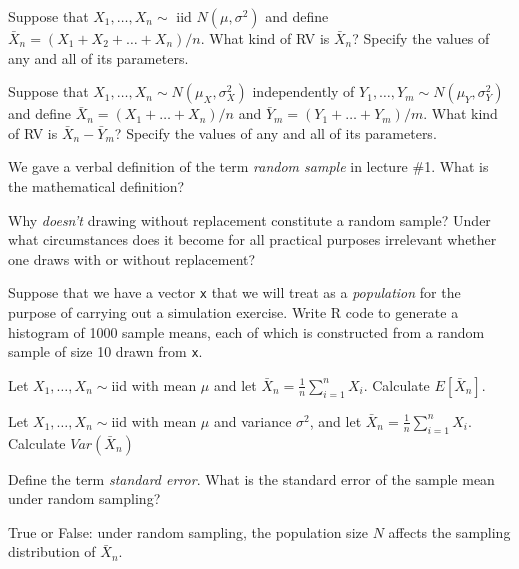 \documentclass[addpoints,12pt]{exam}
\begin{document}
\begin{questions}

\question Suppose that $X_1, \dots, X_n \sim \text{ iid } N(\mu, \sigma^2)$ and define $\bar{X}_n = (X_1 + X_2 + \dots + X_n) / n$.
What kind of RV is $\bar{X}_n$?
Specify the values of any and all of its parameters.


\question Suppose that $X_1, \dots, X_n \sim N(\mu_X, \sigma_X^2)$ independently of $Y_1, \dots, Y_m \sim N(\mu_Y, \sigma^2_Y)$ and define $\bar{X}_n = (X_1 + \dots + X_n)/n$ and $\bar{Y}_m = (Y_1 + \dots + Y_m)/m$.
What kind of RV is $\bar{X}_n - \bar{Y}_m$? 
Specify the values of any and all of its parameters.


\question We gave a verbal definition of the term \emph{random sample} in lecture \#1. What is the mathematical definition?

\question Why \emph{doesn't} drawing without replacement constitute a random sample? Under what circumstances does it become for all practical purposes irrelevant whether one draws with or without replacement?

\question Suppose that we have a vector \texttt{x} that we will treat as a \emph{population} for the purpose of carrying out a simulation exercise.
Write R code to generate a histogram of 1000 sample means, each of which is constructed from a random sample of size 10 drawn from \texttt{x}.

\question Let $X_1, \dots, X_n \sim \text{iid}$ with mean $\mu$ and let $\bar{X}_n = \frac{1}{n}\sum_{i=1}^n X_i$. Calculate $E[\bar{X}_n]$.

\question Let $X_1, \dots, X_n \sim \text{iid}$ with mean $\mu$ and variance $\sigma^2$, and let $\bar{X}_n = \frac{1}{n}\sum_{i=1}^n X_i$. Calculate $Var(\bar{X}_n)$

\question Define the term \emph{standard error}. What is the standard error of the sample mean under random sampling?

\question True or False: under random sampling, the population size $N$ affects the sampling distribution of $\bar{X}_n$.


\end{questions}
\end{document}
